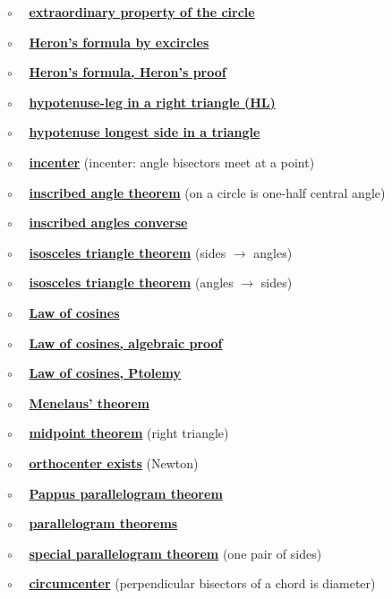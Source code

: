 \documentclass[11pt, oneside]{article}
\begin{document}
$\circ$ \ \ \hyperref[sec:extraordinary_property]{\textbf{extraordinary property of the circle}}

$\circ$ \ \ \hyperref[sec:Heron_formula_excircles]{\textbf{Heron's formula by excircles}}

$\circ$ \ \ \hyperref[sec:Heron_formula_Heron]{\textbf{Heron's formula, Heron's proof}}

$\circ$ \ \ \hyperref[sec:SSA_in_right]{\textbf{hypotenuse-leg in a right triangle (HL)}}

$\circ$ \ \ \hyperref[sec:hypotenuse_longest]{\textbf{hypotenuse longest side in a triangle}}

$\circ$ \ \ \hyperref[sec:incenter]{\textbf{incenter}} (incenter:  angle bisectors meet at a point)

$\circ$ \ \ \hyperref[sec:inscribed_angle_theorem]{\textbf{inscribed angle theorem}} (on a circle is one-half central angle)

$\circ$ \ \ \hyperref[sec:inscribed_angles_converse]{\textbf{inscribed angles converse}}

$\circ$ \ \  \hyperref[sec:isosceles_triangle_theorem]{\textbf{isosceles triangle theorem}} (sides $\rightarrow$ angles)

$\circ$ \ \  \hyperref[sec:isosceles_converse]{\textbf{isosceles triangle theorem}} (angles $\rightarrow$ sides)

$\circ$ \ \ \hyperref[sec:law_of_cosines]{\textbf{Law of cosines}}

$\circ$ \ \ \hyperref[sec:law_of_cosines_algebraic]{\textbf{Law of cosines, algebraic proof}}

$\circ$ \ \ \hyperref[sec:LOC_by_Ptolemy]{\textbf{Law of cosines, Ptolemy}}

$\circ$ \ \ \hyperref[sec:Menelaus_theorem]{\textbf{Menelaus' theorem}}

$\circ$ \ \ \hyperref[sec:right_triangle_midpoint_theorem]{\textbf{midpoint theorem}} (right triangle)

$\circ$ \ \ \hyperref[sec:Newton_altitude]{\textbf{orthocenter exists}}  (Newton)

$\circ$ \ \ \hyperref[sec:PProof_Pappus]{\textbf{Pappus parallelogram theorem}}

$\circ$ \ \ \hyperref[sec:diagonal_theorem]{\textbf{parallelogram theorems}}

$\circ$ \ \ \hyperref[sec:one_pair_of_sides]{\textbf{special parallelogram theorem}} (one pair of sides)

$\circ$ \ \ \hyperref[sec:perpendicular_bisector_of_a_chord]{\textbf{circumcenter}} (perpendicular bisectors of a chord is diameter)
\end{document}
